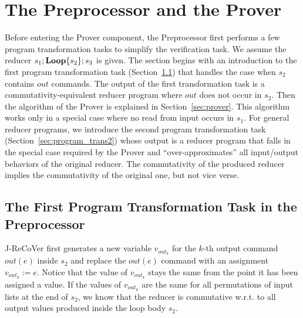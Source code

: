 \documentclass{llncs}
\newcommand{\rloop}{
	\ifmmode
	\mathbf{Loop}
	\else
	\textbf{Loop}
	\fi}
\begin{document}
\section{The Preprocessor and the Prover}
\label{sec:preprocessor_prover}

Before entering the Prover component, the Preprocessor first performs a few program transformation tasks to simplify the verification task.
We assume the reducer $s_1;\rloop\{s_2\};s_3$ is given. The section begins with an introduction to the first program transformation task (Section~\ref{sec:program_trans1}) that handles the case when $s_2$ contains $out$ commands. The output of the first transformation task is a commutativity-equivalent reducer program where $out$ does not occur in $s_2$.  Then the algorithm of the Prover is explained in Section~\ref{sec:prover}. This algorithm works only in a special case where no read from input occurs in $s_1$. For general reducer programs, we introduce the second program transformation task (Section~\ref{sec:program_trans2}) whose output is a reducer program that falls in the special case required by the Prover and ``over-approximates'' all input/output behaviors of the original reducer. The commutativity of the produced reducer implies the commutativity of the original one, but not vice verse.

\subsection{The First Program Transformation Task in the Preprocessor}
\label{sec:program_trans1}
J-ReCoVer  first generates a new variable $v_{out_k}$ for the $k$-th output command $out(e)$ inside $s_2$ and replace the $out(e)$ command with an assignment $v_{out_k}:=e$. 
Notice that the value of $v_{out_k}$ stays the same from the point it has been assigned a value. 
If the values of $v_{out_k}$ are the same for all permutations of input lists at the end of $s_2$, we know that the reducer is commutative w.r.t. to all output values produced inside the loop body $s_2$.
\end{document}

